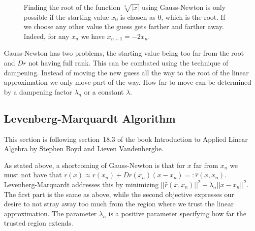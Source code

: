 \begin{figure}[h!]
	\centering
	\caption{Finding the root of the function $\sqrt[3]{|x|}$ using Gauss-Newton is only possible if the starting value $x_0$ is chosen as $0$, which is the root. If we choose any other value the guess gets farther and farther away. Indeed, for any $x_n$ we have $x_{n+1} = -2x_n$.}
	\label{fig:gauss_newton_fails_cubic_root}
\end{figure}

Gauss-Newton has two problems, the starting value being too far from the root and $Dr$ not having full rank. This can be combated using the technique of dampening. Instead of moving the new guess all the way to the root of the linear approximation we only move part of the way. How far to move can be determined by a dampening factor $\lambda_n$ or a constant $\lambda$.

\newpage
\subsection{Levenberg-Marquardt Algorithm}

This section is following section~18.3 of the book Introduction to Applied Linear Algebra by Stephen Boyd and Lieven Vandenberghe\cite{Boyd2018}.

As stated above, a shortcoming of Gauss-Newton is that for $x$ far from $x_n$ we must not have that $r(x) \approx r(x_n) + Dr(x_n)(x-x_n) =: \hat{r}(x, x_n)$. Levenberg-Marquardt addresses this by minimizing $||\hat{r}(x, x_n)||^2 + \lambda_n ||x-x_n||^2$. The first part is the same as above, while the second objective expresses our desire to not stray away too much from the region where we trust the linear approximation. The parameter $\lambda_n$ is a positive parameter specifying how far the trusted region extends.

